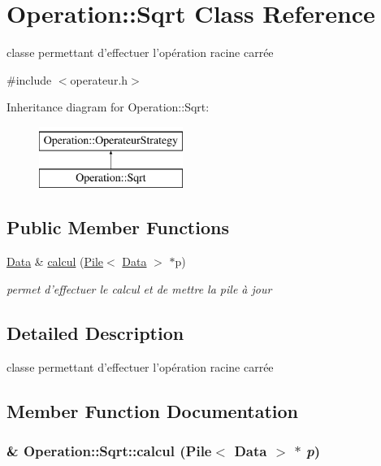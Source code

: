 \hypertarget{classOperation_1_1Sqrt}{
\section{Operation::Sqrt Class Reference}
\label{classOperation_1_1Sqrt}
}


classe permettant d'effectuer l'opération racine carrée  




{\ttfamily \#include $<$operateur.h$>$}

Inheritance diagram for Operation::Sqrt:\begin{figure}[H]
\begin{center}
\leavevmode
\includegraphics[height=2cm]{classOperation_1_1Sqrt}
\end{center}
\end{figure}
\subsection*{Public Member Functions}
\begin{DoxyCompactItemize}
\item 
\hyperlink{classNombre_1_1Data}{Data} \& \hyperlink{classOperation_1_1Sqrt_aa5cb4ed977ec0720237d13320de62973}{calcul} (\hyperlink{classPile}{Pile}$<$ \hyperlink{classNombre_1_1Data}{Data} $>$ $\ast$p)
\begin{DoxyCompactList}\small\item\em permet d'effectuer le calcul et de mettre la pile à jour \item\end{DoxyCompactList}\end{DoxyCompactItemize}


\subsection{Detailed Description}
classe permettant d'effectuer l'opération racine carrée 

\subsection{Member Function Documentation}
\hypertarget{classOperation_1_1Sqrt_aa5cb4ed977ec0720237d13320de62973}{
\subsubsection[{calcul}]{\& Operation::Sqrt::calcul ({\bf Pile}$<$ {\bf Data} $>$ $\ast$ {\em p})}}
\label{classOperation_1_1Sqrt_aa5cb4ed977ec0720237d13320de62973}


